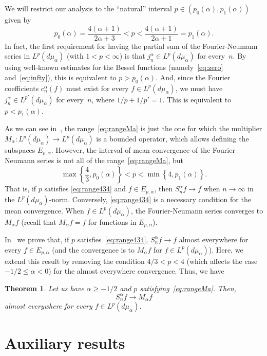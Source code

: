 \documentclass[10pt,a4paper]{article}
\newcommand{\ma}{M_{\alpha}}
\newcommand{\mua}{d\mu_\alpha}
\newcommand{\jna}{j_n^{\alpha}}
\newcommand{\cna}{c_n^{\alpha}}
\newcommand{\Sna}{S_n^{\alpha}}
\theoremstyle{plain}
\newtheorem*{theor}{Theorem}
\begin{document}
We will restrict our analysis to the ``natural'' interval $p \in (p_0(\alpha),p_1(\alpha))$ given by
\begin{equation}
\label{eq:rangeMa}
  p_0(\alpha) = \frac{4(\alpha+1)}{2\alpha+3} < p 
  < \frac{4(\alpha+1)}{2\alpha+1} = p_1(\alpha).
\end{equation}
In fact, the first requirement for having the partial sum of the Fourier-Neumann series in 
$L^p(\mua)$ (with $1<p<\infty$) is that $\jna \in L^p(\mua)$ for every~$n$. 
By using well-known estimates for the Bessel functions (namely~\eqref{eq:zero} and~\eqref{eq:infty}), this is equivalent to 
$p > p_0(\alpha)$. And, since the Fourier coefficients $\cna(f)$
must exist for every $f \in L^p(\mua)$, we must have $\jna \in L^{p'}(\mua)$ for 
every~$n$, where $1/p+1/p'=1$. This is equivalent to $p < p_1(\alpha)$.

As we can see in~\cite{V}, the range~\eqref{eq:rangeMa} is just the one for which the multiplier $\ma: L^p(\mua) \to L^p(\mua)$ is a bounded operator, which allows defining the subspaces $E_{p,\alpha}$.
However, the interval of mean convergence of the Fourier-Neumann series is not all of the range~\eqref{eq:rangeMa},
but
\begin{equation}
\label{eq:range434}
  \max\left\{\frac43, p_0(\alpha) \right\} < p 
    < \min\left\{4, p_1(\alpha) \right\}.
\end{equation}
That is, if $p$ satisfies \eqref{eq:range434} and $f \in E_{p,\alpha}$, then $\Sna f \to f$ when $n \to \infty$ in the $L^p(\mua)$-norm. Conversely, \eqref{eq:range434} is a necessary condition for the mean convergence. When $f \in L^p(\mua)$, the Fourier-Neumann series converges to $\ma f$ (recall that $\ma f = f$ for functions in $E_{p,\alpha}$).

In~\cite{CiGPV} we prove that, if $p$ satisfies~\eqref{eq:range434}, $\Sna f \to f$ almost everywhere for every $f \in E_{p,\alpha}$ (and the convergence is to $\ma f$ for $f \in L^p(\mua)$). Here, we extend this result by removing the condition $4/3 < p < 4$ (which affects the case $-1/2 \le \alpha < 0$) for the almost everywhere convergence. Thus, we have

\begin{theor}
Let us have $\alpha \ge -1/2$ and $p$ satisfying~\eqref{eq:rangeMa}. Then,
$$
  \Sna f \to \ma f
$$
almost everywhere for every $f \in L^p(\mua)$. 
\end{theor}

\section{Auxiliary results}
\end{document}
